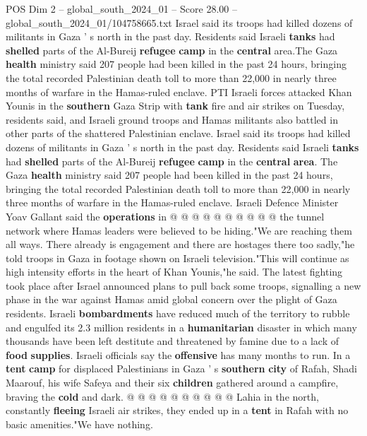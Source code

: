 \begin{textsample}{POS Dim 2 – global\_south\_2024\_01 – Score 28.00 – global\_south\_2024\_01/104758665.txt}  \label{ex:f2_pos_129}
Israel said its troops had killed dozens of militants in Gaza ' s north in the past day.
Residents said Israeli \textbf{tanks} had \textbf{shelled} parts of the Al-Bureij \textbf{refugee} \textbf{camp} in the \textbf{central} area.The Gaza \textbf{health} ministry said 207 people had been killed in the past 24 hours, bringing the total recorded Palestinian death toll to more than 22,000 in nearly three months of warfare in the Hamas-ruled enclave.
PTI Israeli forces attacked Khan Younis in the \textbf{southern} Gaza Strip with \textbf{tank} fire and air strikes on Tuesday, residents said, and Israeli ground troops and Hamas militants also battled in other parts of the shattered Palestinian enclave.
Israel said its troops had killed dozens of militants in Gaza ' s north in the past day.
Residents said Israeli \textbf{tanks} had \textbf{shelled} parts of the Al-Bureij \textbf{refugee} \textbf{camp} in the \textbf{central} \textbf{area}.
The Gaza \textbf{health} ministry said 207 people had been killed in the past 24 hours, bringing the total recorded Palestinian death toll to more than 22,000 in nearly three months of warfare in the Hamas-ruled enclave.
Israeli Defence Minister Yoav Gallant said the \textbf{operations} in @ @ @ @ @ @ @ @ @ @ the tunnel network where Hamas leaders were believed to be hiding."We are reaching them all ways.
There already is engagement and there are hostages there too sadly,"he told troops in Gaza in footage shown on Israeli television."This will continue as high intensity efforts in the heart of Khan Younis,"he said.
The latest fighting took place after Israel announced plans to pull back some troops, signalling a new phase in the war against Hamas amid global concern over the plight of Gaza residents.
Israeli \textbf{bombardments} have reduced much of the territory to rubble and engulfed its 2.3 million residents in a \textbf{humanitarian} disaster in which many thousands have been left destitute and threatened by famine due to a lack of \textbf{food} \textbf{supplies}.
Israeli officials say the \textbf{offensive} has many months to run.
In a \textbf{tent} \textbf{camp} for displaced Palestinians in Gaza ' s \textbf{southern} \textbf{city} of Rafah, Shadi Maarouf, his wife Safeya and their six \textbf{children} gathered around a campfire, braving the \textbf{cold} and dark. @ @ @ @ @ @ @ @ @ @ Lahia in the north, constantly \textbf{fleeing} Israeli air strikes, they ended up in a \textbf{tent} in Rafah with no basic amenities."We have nothing.

\end{textsample}
